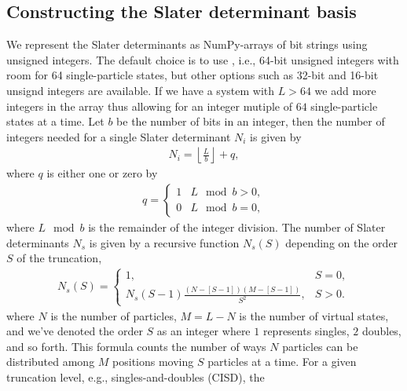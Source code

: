         \subsection{Constructing the Slater determinant basis}
            We represent the Slater determinants as NumPy-arrays \cite{numpy} of
            bit strings using unsigned integers.
            The default choice is to use , i.e., 64-bit unsigned
            integers with room for 64 single-particle states, but other options
            such as 32-bit and 16-bit unsignd integers are available.
            If we have a system with $L > 64$ we add more integers in the array
            thus allowing for an integer mutiple of $64$ single-particle states at
            a time.
            Let $b$ be the number of bits in an integer, then the number of
            integers needed for a single Slater determinant $N_i$ is given by
            \begin{align}
                N_i = \left\lfloor\frac{L}{b}\right\rfloor
                + q,
            \end{align}
            where $q$ is either one or zero by
            \begin{align}
                q = \begin{cases}
                    1 & L \mod b > 0, \\
                    0 & L \mod b = 0,
                \end{cases}
            \end{align}
            where $L \mod b$ is the remainder of the integer division.
            The number of Slater determinants $N_s$ is given by a recursive
            function $N_s(S)$ depending on the order $S$ of the truncation,
            \begin{align}
                N_s(S) = \begin{cases}
                    1, & S = 0, \\
                    N_s(S - 1) \frac{(N - [S - 1])(M - [S - 1])}{S^2}, & S > 0.
                \end{cases}
            \end{align}
            where $N$ is the number of particles, $M = L - N$ is the number of
            virtual states, and we've denoted the order $S$ as an integer where
            $1$ represents singles, $2$ doubles, and so forth.
            This formula counts the number of ways $N$ particles can be
            distributed among $M$ positions moving $S$ particles at a time.
            For a given truncation level, e.g., singles-and-doubles (CISD), the
